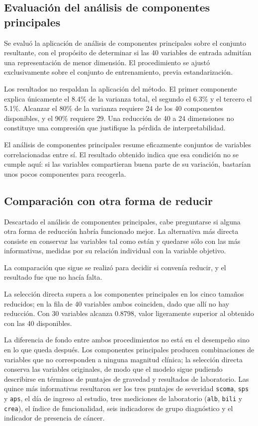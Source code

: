 \documentclass[11pt]{article}
\begin{document}
\subsection{Evaluación del análisis de componentes principales}

Se evaluó la aplicación de análisis de componentes principales sobre el conjunto resultante, con
el propósito de determinar si las 40 variables de entrada admitían una representación de menor
dimensión. El procedimiento se ajustó exclusivamente sobre el conjunto de entrenamiento, previa
estandarización.

Los resultados no respaldan la aplicación del método. El primer componente explica únicamente el
8.4\% de la varianza total, el segundo el 6.3\% y el tercero el 5.1\%. Alcanzar el 80\% de la
varianza requiere 24 de los 40 componentes disponibles, y el 90\% requiere 29. Una reducción de 40
a 24 dimensiones no constituye una compresión que justifique la pérdida de interpretabilidad.

El análisis de componentes principales resume eficazmente conjuntos de variables correlacionadas
entre sí. El resultado obtenido indica que esa condición no se cumple aquí: si las variables
compartieran buena parte de su variación, bastarían unos pocos componentes para recogerla.

\subsection{Comparación con otra forma de reducir}

Descartado el análisis de componentes principales, cabe preguntarse si alguna otra forma de
reducción habría funcionado mejor. La alternativa más directa consiste en conservar las variables
tal como están y quedarse sólo con las más informativas, medidas por su relación individual con la
variable objetivo.

La comparación que sigue se realizó para decidir si convenía reducir, y el resultado fue que no
hacía falta.



La selección directa supera a los componentes principales en los cinco tamaños reducidos; en la
fila de 40 variables ambos coinciden, dado que allí no hay reducción. Con 30 variables alcanza
0.8798, valor ligeramente superior al obtenido con las 40 disponibles.

La diferencia de fondo entre ambos procedimientos no está en el desempeño sino en lo que queda
después. Los componentes principales producen combinaciones de variables que no corresponden a
ninguna magnitud clínica; la selección directa conserva las variables originales, de modo que el
modelo sigue pudiendo describirse en términos de puntajes de gravedad y resultados de laboratorio.
Las quince más informativas resultaron ser los tres puntajes de severidad \texttt{scoma},
\texttt{sps} y \texttt{aps}, el día de ingreso al estudio, tres mediciones de laboratorio
(\texttt{alb}, \texttt{bili} y \texttt{crea}), el índice de funcionalidad, seis indicadores de
grupo diagnóstico y el indicador de presencia de cáncer.
\end{document}
